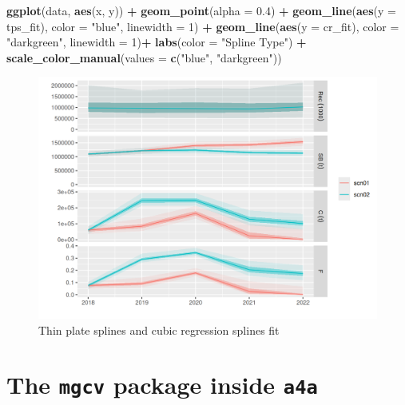 \documentclass[
]{book}
\newenvironment{Shaded}{\begin{snugshade}}{\end{snugshade}}
\newcommand{\AttributeTok}[1]{\textcolor[rgb]{0.13,0.29,0.53}{#1}}
\newcommand{\DecValTok}[1]{\textcolor[rgb]{0.00,0.00,0.81}{#1}}
\newcommand{\FloatTok}[1]{\textcolor[rgb]{0.00,0.00,0.81}{#1}}
\newcommand{\FunctionTok}[1]{\textcolor[rgb]{0.13,0.29,0.53}{\textbf{#1}}}
\newcommand{\NormalTok}[1]{#1}
\newcommand{\SpecialCharTok}[1]{\textcolor[rgb]{0.81,0.36,0.00}{\textbf{#1}}}
\newcommand{\StringTok}[1]{\textcolor[rgb]{0.31,0.60,0.02}{#1}}
\begin{document}
\begin{Shaded}
\begin{Highlighting}[]
\FunctionTok{ggplot}\NormalTok{(data, }\FunctionTok{aes}\NormalTok{(x, y)) }\SpecialCharTok{+}
  \FunctionTok{geom\_point}\NormalTok{(}\AttributeTok{alpha =} \FloatTok{0.4}\NormalTok{) }\SpecialCharTok{+}
  \FunctionTok{geom\_line}\NormalTok{(}\FunctionTok{aes}\NormalTok{(}\AttributeTok{y =}\NormalTok{ tps\_fit), }\AttributeTok{color =} \StringTok{"blue"}\NormalTok{, }\AttributeTok{linewidth =} \DecValTok{1}\NormalTok{) }\SpecialCharTok{+}
  \FunctionTok{geom\_line}\NormalTok{(}\FunctionTok{aes}\NormalTok{(}\AttributeTok{y =}\NormalTok{ cr\_fit), }\AttributeTok{color =} \StringTok{"darkgreen"}\NormalTok{, }\AttributeTok{linewidth =} \DecValTok{1}\NormalTok{)}\SpecialCharTok{+}
  \FunctionTok{labs}\NormalTok{(}\AttributeTok{color =} \StringTok{"Spline Type"}\NormalTok{) }\SpecialCharTok{+}
  \FunctionTok{scale\_color\_manual}\NormalTok{(}\AttributeTok{values =} \FunctionTok{c}\NormalTok{(}\StringTok{"blue"}\NormalTok{, }\StringTok{"darkgreen"}\NormalTok{))}
\end{Highlighting}
\end{Shaded}

\begin{figure}
\centering
\includegraphics{_bookdown_files/_main_files/figure-html/unnamed-chunk-17-1.png}
\caption{\label{fig:unnamed-chunk-17}Thin plate splines and cubic regression splines fit}
\end{figure}

\hypertarget{the-mgcv-package-inside-a4a}{%
\section{\texorpdfstring{The \texttt{mgcv} package inside \texttt{a4a}}{The mgcv package inside a4a}}\label{the-mgcv-package-inside-a4a}}
\end{document}
